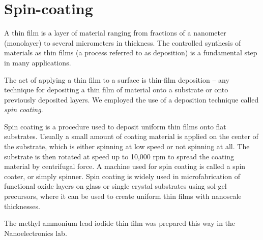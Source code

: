 \documentclass[%
 reprint,
 amsmath,amssymb,
 aps,
]{revtex4-2}
\begin{document}
\section{Spin-coating}
	A thin film is a layer of material ranging from fractions of a nanometer (monolayer) to several micrometers in thickness. The controlled synthesis of materials as thin films (a process referred to as deposition) is a fundamental step in many applications.
	\par 
	The act of applying a thin film to a surface is thin-film deposition – any technique for depositing a thin film of material onto a substrate or onto previously deposited layers. We employed the use of a deposition technique called \textit{spin coating}.
	\par 
	Spin coating is a procedure used to deposit uniform thin films onto flat substrates. Usually a small amount of coating material is applied on the center of the substrate, which is either spinning at low speed or not spinning at all. The substrate is then rotated at speed up to 10,000 rpm to spread the coating material by centrifugal force. A machine used for spin coating is called a spin coater, or simply spinner. Spin coating is widely used in microfabrication of functional oxide layers on glass or single crystal substrates using sol-gel precursors, where it can be used to create uniform thin films with nanoscale thicknesses.
	\par 
	The methyl ammonium lead iodide thin film was prepared this way in the Nanoelectronics lab.
\nocite{*}

\end{document}

